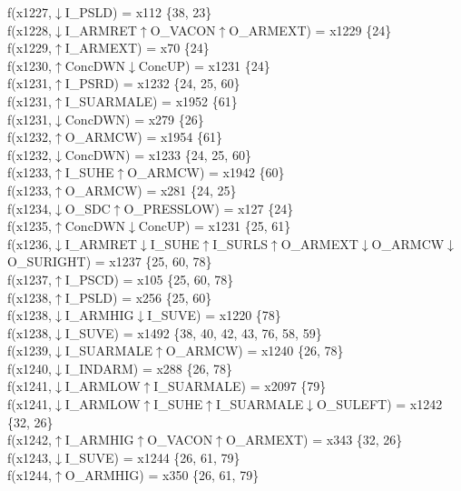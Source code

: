 f(x1227,$\downarrow$I\_PSLD) = x112 \{38, 23\} \\  
f(x1228,$\downarrow$I\_ARMRET$\uparrow$O\_VACON$\uparrow$O\_ARMEXT) = x1229 \{24\} \\  
f(x1229,$\uparrow$I\_ARMEXT) = x70 \{24\} \\  
f(x1230,$\uparrow$ConcDWN$\downarrow$ConcUP) = x1231 \{24\} \\  
f(x1231,$\uparrow$I\_PSRD) = x1232 \{24, 25, 60\} \\  
f(x1231,$\uparrow$I\_SUARMALE) = x1952 \{61\} \\  
f(x1231,$\downarrow$ConcDWN) = x279 \{26\} \\  
f(x1232,$\uparrow$O\_ARMCW) = x1954 \{61\} \\  
f(x1232,$\downarrow$ConcDWN) = x1233 \{24, 25, 60\} \\  
f(x1233,$\uparrow$I\_SUHE$\uparrow$O\_ARMCW) = x1942 \{60\} \\  
f(x1233,$\uparrow$O\_ARMCW) = x281 \{24, 25\} \\  
f(x1234,$\downarrow$O\_SDC$\uparrow$O\_PRESSLOW) = x127 \{24\} \\  
f(x1235,$\uparrow$ConcDWN$\downarrow$ConcUP) = x1231 \{25, 61\} \\  
f(x1236,$\downarrow$I\_ARMRET$\downarrow$I\_SUHE$\uparrow$I\_SURLS$\uparrow$O\_ARMEXT$\downarrow$O\_ARMCW$\downarrow$O\_SURIGHT) = x1237 \{25, 60, 78\} \\  
f(x1237,$\uparrow$I\_PSCD) = x105 \{25, 60, 78\} \\  
f(x1238,$\uparrow$I\_PSLD) = x256 \{25, 60\} \\  
f(x1238,$\downarrow$I\_ARMHIG$\downarrow$I\_SUVE) = x1220 \{78\} \\  
f(x1238,$\downarrow$I\_SUVE) = x1492 \{38, 40, 42, 43, 76, 58, 59\} \\  
f(x1239,$\downarrow$I\_SUARMALE$\uparrow$O\_ARMCW) = x1240 \{26, 78\} \\  
f(x1240,$\downarrow$I\_INDARM) = x288 \{26, 78\} \\  
f(x1241,$\downarrow$I\_ARMLOW$\uparrow$I\_SUARMALE) = x2097 \{79\} \\  
f(x1241,$\downarrow$I\_ARMLOW$\uparrow$I\_SUHE$\uparrow$I\_SUARMALE$\downarrow$O\_SULEFT) = x1242 \{32, 26\} \\  
f(x1242,$\uparrow$I\_ARMHIG$\uparrow$O\_VACON$\uparrow$O\_ARMEXT) = x343 \{32, 26\} \\  
f(x1243,$\downarrow$I\_SUVE) = x1244 \{26, 61, 79\} \\  
f(x1244,$\uparrow$O\_ARMHIG) = x350 \{26, 61, 79\} \\  
